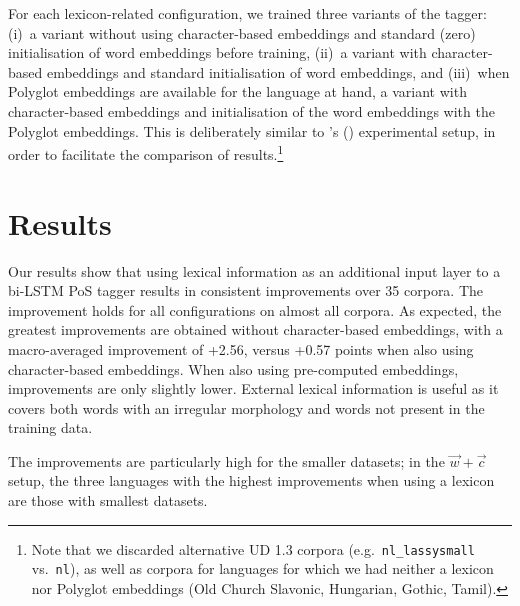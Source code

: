 \documentclass[11pt,a4paper]{article}
\begin{document}
For each lexicon-related configuration, we trained three variants of the tagger: (i)~a variant without using
character-based embeddings and standard (zero) initialisation of word embeddings before training, (ii)~a variant with
character-based embeddings and standard initialisation of word embeddings, and (iii)~when Polyglot embeddings are
available for the language at hand, a variant with character-based embeddings and initialisation of the word embeddings
with the Polyglot embeddings. This is deliberately similar to \citeauthor{plank16}'s (\citeyear{plank16}) experimental
setup, in order to facilitate the comparison of results.\footnote{Note that we discarded alternative UD 1.3 corpora
  (e.g.~{\tt nl\_lassysmall} vs.~{\tt nl}), as well as corpora for languages for which we had neither a
  lexicon nor Polyglot embeddings (Old Church Slavonic, Hungarian, Gothic, Tamil).}


\section{Results}

Our results show that using lexical information as an additional input layer to a bi-LSTM PoS tagger results in
consistent improvements over 35 corpora. The improvement holds for all configurations on almost all corpora. As
expected, the greatest improvements are obtained without character-based embeddings, with a macro-averaged improvement
of +2.56, versus +0.57 points when also using character-based embeddings. When also using pre-computed embeddings,
improvements are only slightly lower. External lexical information is useful as it covers both words with an irregular
morphology and words not present in the training data.

The improvements are particularly high for the smaller datasets; in the $\vec{w}+\vec{c}$ setup, the three
languages with the highest improvements when using a lexicon are those with smallest datasets.



\end{document}
